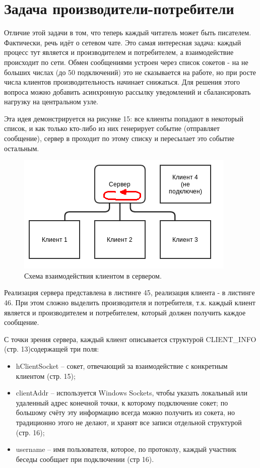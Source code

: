\documentclass[a4paper, 12pt]{article}		%
\begin{document}
\newpage
\section{Задача производители-потребители}

Отличие этой задачи в том, что теперь каждый читатель может быть писателем. Фактически, речь идёт о сетевом чате\cite{Dushutina}. Это самая интересная задача: каждый процесс тут является и производителем и потребителем, а взаимодействие происходит по сети. Обмен сообщениями устроен через список сокетов - на не больших числах (до 50 подключений) это не сказывается на работе, но при росте числа клиентов производительность начинает снижаться. Для решения этого вопроса можно добавить асинхронную рассылку уведомлений и сбалансировать нагрузку на центральном узле.

Эта идея демонстрируется на рисунке 15: все клиенты попадают в некоторый список, и как только кто-либо из них генерирует событие (отправляет сообщение), сервер в проходит по этому списку и пересылает это событие остальным. 
\begin{figure}[h!]
\centering
\includegraphics[scale=1]{res/server}
\caption{Схема взаимодействия клиентом в сервером.}
\end{figure}

Реализация сервера представлена в листинге 45, реализация клиента - в листинге 46. При этом сложно выделить производителя и потребителя, т.к. каждый клиент является и производителем и потребителем, который должен получить каждое сообщение.

С точки зрения сервера, каждый клиент описывается структурой CLIENT\_INFO (стр. 13)содержащей три поля:
\begin{itemize}
\item hClientSocket -- сокет, отвечающий за взаимодействие с конкретным клиентом (стр. 15);
\item clientAddr -- используется Windows Sockets, чтобы указать локальный или удаленный адрес конечной точки, к которому подключение сокет; по большому счёту эту информацию всегда можно получить из сокета, но традиционно этого не делают, и хранят все записи отдельной структурой (стр. 16);
\item username -- имя пользователя, которое, по протоколу, каждый участник беседы сообщает при подключении (стр 16).
\end{itemize}
\end{document}
